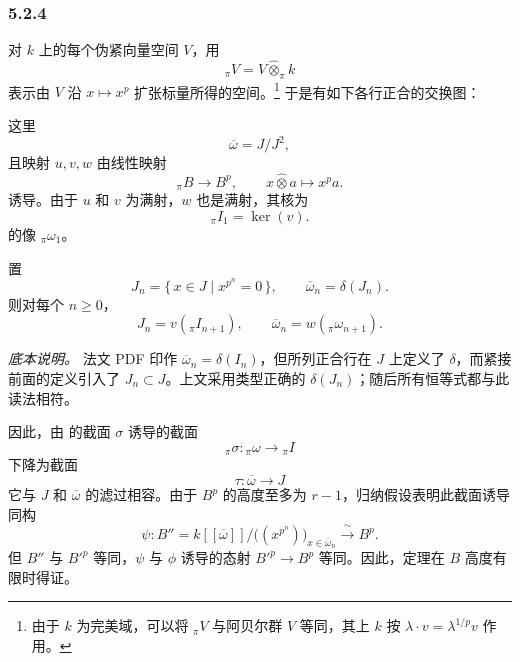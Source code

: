 
\subsubsection*{5.2.4}
\label{sga3:VIIB:5.2.4}

对 \(k\) 上的每个伪紧向量空间 \(V\)，用
\[
  {}_{\pi}V
  =
  V\widehat\otimes_{\pi}k
\]
表示由 \(V\) 沿 \(x\mapsto x^p\) 扩张标量所得的空间。\footnote{\label{sga3:VIIB:nde:160}由于 \(k\) 为完美域，可以将 \({}_{\pi}V\) 与阿贝尔群 \(V\) 等同，其上 \(k\) 按 \(\lambda\cdot v=\lambda^{1/p}v\) 作用。}
于是有如下各行正合的交换图：

\begin{figure}[H]
  \centering
  
\end{figure}

\noindent
这里
\[
  \overline\omega=J/J^2,
\]
且映射 \(u,v,w\) 由线性映射
\[
  {}_{\pi}B\longrightarrow B^p,
  \qquad
  x\widehat\otimes a\longmapsto x^pa.
\]
诱导。由于 \(u\) 和 \(v\) 为满射，\(w\) 也是满射，其核为
\[
  {}_{\pi}I_1=\ker(v).
\]
的像 \({}_{\pi}\omega_1\)。

置
\[
  J_n=\{\,x\in J\mid x^{p^n}=0\,\},
  \qquad
  \overline\omega_n=\delta(J_n).
\]
则对每个 \(n\geq0\)，
\[
  J_n=v({}_{\pi}I_{n+1}),
  \qquad
  \overline\omega_n=w({}_{\pi}\omega_{n+1}).
\]

\label{sga3:VIIB:5.2.4:delta-source-note}
\noindent\textit{底本说明。}\enspace
法文 PDF 印作 \(\overline\omega_n=\delta(I_n)\)，但所列正合行在 \(J\) 上定义了 \(\delta\)，而紧接前面的定义引入了 \(J_n\subset J\)。上文采用类型正确的 \(\delta(J_n)\)；随后所有恒等式都与此读法相符。

因此，由  的截面 \(\sigma\) 诱导的截面
\[
  {}_{\pi}\sigma:{}_{\pi}\omega\longrightarrow{}_{\pi}I
\]
下降为截面
\[
  \tau:\overline\omega\longrightarrow J
\]
它与 \(J\) 和 \(\overline\omega\) 的滤过相容。由于 \(B^p\) 的高度至多为 \(r-1\)，归纳假设表明此截面诱导同构
\[
  \psi:
  B''
  =
  k[[\overline\omega]]
  \big/
  \bigl((x^{p^n})\bigr)_{x\in\overline\omega_n}
  \xrightarrow{\ \sim\ }
  B^p.
\]
但 \(B''\) 与 \(B'^p\) 等同，\(\psi\) 与 \(\phi\) 诱导的态射 \(B'^p\to B^p\) 等同。因此，定理在 \(B\) 高度有限时得证。
